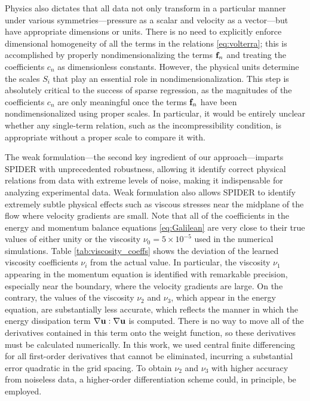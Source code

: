\documentclass[preprint]{article}
\def\bi#1{\textbf{#1}}
\begin{document}
Physics also dictates that all data not only transform in a particular manner under various symmetries---pressure as a scalar and velocity as a vector---but have appropriate dimensions or units. There is no need to explicitly enforce dimensional homogeneity of all the terms in the relations \eqref{eq:volterra}; this is accomplished by properly nondimensionalizing the terms ${\bf f}_n$ and treating the coefficients $c_n$ as dimensionless constants. However, the physical units determine the scales $S_i$ that play an essential role in nondimensionalization. This step is absolutely critical to the success of sparse regression, as the magnitudes of the coefficients $c_n$ are only meaningful once the terms ${\bf f}_n$ have been nondimensionalized using proper scales. In particular, it would be entirely unclear whether any single-term relation, such as the incompressibility condition, is appropriate without a proper scale to compare it with.

The weak formulation---the second key ingredient of our approach---imparts SPIDER with unprecedented robustness, allowing it identify correct physical relations from data with extreme levels of noise, making it indispensable for analyzing experimental data. Weak formulation also allows SPIDER to identify extremely subtle physical effects such as viscous stresses near the midplane of the flow where velocity gradients are small. Note that all of the coefficients in the energy and momentum balance equations \eqref{eq:Galilean} are very close to their true values of either unity or the viscosity $\nu_0 = 5 \times 10^{-5}$ used in the numerical simulations. 
Table \ref{tab:viscosity_coeffs} shows the deviation of the learned viscosity coefficients $\nu_i$ from the actual value. In particular, the viscosity $\nu_1$ appearing in the momentum equation is identified with remarkable precision, especially near the boundary, where the velocity gradients are large. On the contrary, the values of the viscosity $\nu_2$ and $\nu_3$, which appear in the energy equation, are substantially less accurate, which reflects the manner in which the energy dissipation term $\nabla{\bf u} : \nabla {\bi u}$ is computed. There is no way to move all of the derivatives contained in this term onto the weight function, so these derivatives must be calculated numerically. In this work, we used central finite differencing for all first-order derivatives that cannot be eliminated, incurring a substantial error quadratic in the grid spacing. To obtain $\nu_2$ and $\nu_3$ with higher accuracy from noiseless data, a higher-order differentiation scheme could, in principle, be employed.
\end{document}
